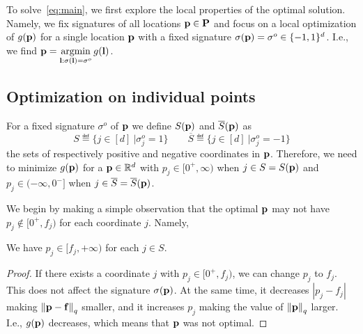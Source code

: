 To solve~\eqref{eq:main}, we first explore the local properties of the optimal solution. Namely, we fix signatures of all locations $\mathbf{p}\in\mathbf{P}$ and focus on a local optimization of $g(\mathbf{p})$ for a single location $\mathbf{p}$ with a fixed signature $\sigma(\mathbf{p})=\sigma^o\in\{-1,1\}^d$. 
I.e., we find $\mathbf{p}=\mathop{\rm argmin}\limits_{\mathbf{l}:\sigma(\mathbf{l})=\sigma^o} g(\mathbf{l})$. 

\subsection{Optimization on individual points}
\label{sec:upper_local}
For a fixed signature $\sigma^o$ of $\mathbf{p}$ we define 
$S(\mathbf{p})$ and $\overline{S}(\mathbf{p})$ as
$$
S\eqdef\{j\in [d]\ \vert \sigma_{j}^{o}=1\}
\quad\quad
\overline{S}\eqdef\{j\in [d]\ \vert \sigma_j^o=-1\}
$$
the sets of respectively positive and negative coordinates in $\mathbf{p}$. Therefore, we need to minimize $g(\mathbf{p})$ for a $\mathbf{p}\in{\mathbb R}^d$ with  $p_j\in[0^+,\infty)$ when $j\in S=S(\mathbf{p})$ and $p_j\in(-\infty,0^-]$ when $j\in\overline{S}=\overline{S}(\mathbf{p})$. 

We begin by making a simple observation that the optimal $\mathbf{p}$ may not have $p_j\notin[0^+,f_j)$ for each coordinate $j$. Namely,
\begin{claim}
    \label{cl:coordinate-wise condition}
    We have $p_j\in[f_j,+\infty)$ for each $j\in S$.
\end{claim}
\begin{proof}
If there exists a coordinate $j$ with $p_j\in[0^+,f_j)$, we can change $p_j$ to $f_j$. This does not affect the signature $\sigma(\mathbf{p})$. At the same time, it decreases $|p_j-f_j|$ making $\left\Vert \mathbf{p}-\mathbf{f}\right\Vert_{q}$ smaller, and it increases $p_j$ making the value of $\left\Vert \mathbf{p}\right\Vert_{q}$ larger. I.e., $g(\mathbf{p})$ decreases, which means that $\mathbf{p}$ was not optimal.
\end{proof}

